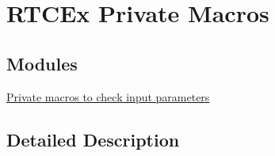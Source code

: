 \hypertarget{group___r_t_c_ex___private___macros}{}\section{R\+T\+C\+Ex Private Macros}
\label{group___r_t_c_ex___private___macros}
\subsection*{Modules}
\begin{DoxyCompactItemize}
\item 
\hyperlink{group___r_t_c_ex___i_s___r_t_c___definitions}{Private macros to check input parameters}
\end{DoxyCompactItemize}


\subsection{Detailed Description}
